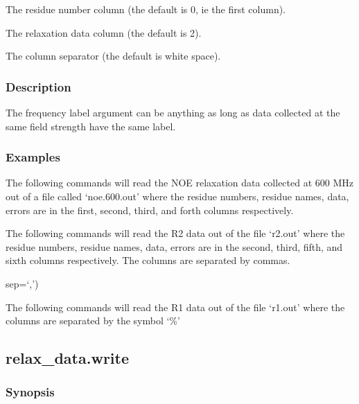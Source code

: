   The residue number column (the default is 0, ie the first column).

  The relaxation data column (the default is 2).

  The column separator (the default is white space).

\subsubsection{Description}

The frequency label argument can be anything as long as data collected at the same field
strength have the same label.


\subsubsection{Examples}

The following commands will read the NOE relaxation data collected at 600 MHz out of a file
called `noe.600.out' where the residue numbers, residue names, data, errors are in the
first, second, third, and forth columns respectively.




The following commands will read the R2 data out of the file `r2.out' where the residue
numbers, residue names, data, errors are in the second, third, fifth, and sixth columns
respectively.  The columns are separated by commas.


                       sep=`,')


The following commands will read the R1 data out of the file `r1.out' where the columns are
separated by the symbol `\%'




\newpage

\subsection{relax\_data.write}


\subsubsection{Synopsis}

